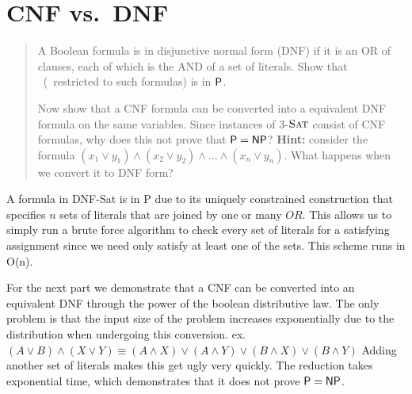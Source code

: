 
\section*{CNF vs.\ DNF }
    \begin{quote}
    A Boolean formula is in disjunctive normal form (DNF) if it is an OR of clauses,
    each of which is the AND of a set of literals.
    Show that \dnfsat\ (\sat\ restricted to such formulas) is in $\P$.

    Now show that a CNF formula can be converted into a equivalent DNF formula on the same variables.
    Since instances of 3-$\sat$ consist of CNF formulas, why does this not prove that $\P = \NP$?
    {\bf Hint:} consider the formula $(x_1 \vee  y_1) \wedge (x_2 \vee y_2) \wedge \ldots \wedge (x_n \vee y_n).$
    What happens when we convert it to DNF form?
    \end{quote}


A formula in DNF-Sat is in P due to its uniquely constrained construction that specifies $n$ sets of literals that are joined by one or many $OR$. This allows us to simply run a brute force algorithm to check every set of literals for a satisfying assignment since we need only satisfy at least one of the sets. This scheme runs in O(n).

For the next part we demonstrate that a CNF can be converted into an equivalent DNF through the power of the boolean distributive law. The only problem is that the input size of the problem increases exponentially due to the distribution when undergoing this conversion. ex. 
$(A \vee B) \wedge (X \vee  Y) \equiv (A\wedge X) \vee (A \wedge Y) \vee (B \wedge X) \vee (B \wedge Y)$ Adding another set of literals makes this get ugly very quickly. The reduction takes exponential time, which demonstrates that it does not prove $\P=\NP$.

